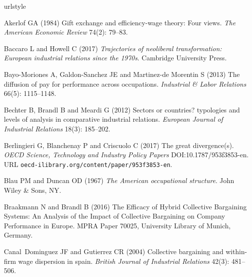 \documentclass[12pt]{article}
\begin{document}
\begin{thebibliography}{38}
\providecommand{\natexlab}[1]{#1}
\providecommand{\url}[1]{\texttt{#1}}
\providecommand{\urlprefix}{URL }
\expandafter\ifx\csname urlstyle\endcsname\relax
  \providecommand{\doi}[1]{DOI:\discretionary{}{}{}#1}\else
  \providecommand{\doi}{DOI:\discretionary{}{}{}\begingroup
  \urlstyle{rm}\Url}\fi

Akerlof GA (1984) Gift exchange and efficiency-wage theory: Four views.
\newblock \emph{The American Economic Review} 74(2): 79--83.

Baccaro L and Howell C (2017) \emph{Trajectories of neoliberal transformation:
  European industrial relations since the 1970s}.
\newblock Cambridge University Press.

Bayo-Moriones A, Galdon-Sanchez JE and Martinez-de Morentin S (2013) The
  diffusion of pay for performance across occupations.
\newblock \emph{Industrial \& Labor Relations} 66(5): 1115--1148.

Bechter B, Brandl B and Meardi G (2012) Sectors or countries? typologies and
  levels of analysis in comparative industrial relations.
\newblock \emph{European Journal of Industrial Relations} 18(3): 185--202.

Berlingieri G, Blanchenay P and Criscuolo C (2017) The great divergence(s).
\newblock \emph{OECD Science, Technology and Industry Policy Papers}
  \doi{10.1787/953f3853-en}.
\newblock
  \urlprefix\url{oecd-ilibrary.org/content/paper/953f3853-en}.

Blau PM and Duncan OD (1967) \emph{The American occupational structure}.
\newblock John Wiley \& Sons, NY.

Braakmann N and Brandl B (2016) {The Efficacy of Hybrid Collective Bargaining
  Systems: An Analysis of the Impact of Collective Bargaining on Company
  Performance in Europe}.
\newblock MPRA Paper 70025, University Library of Munich, Germany.

Canal~Dominguez JF and Gutierrez CR (2004) Collective bargaining and
  within-firm wage dispersion in spain.
\newblock \emph{British Journal of Industrial Relations} 42(3): 481--506.


\end{thebibliography}
\end{document}
